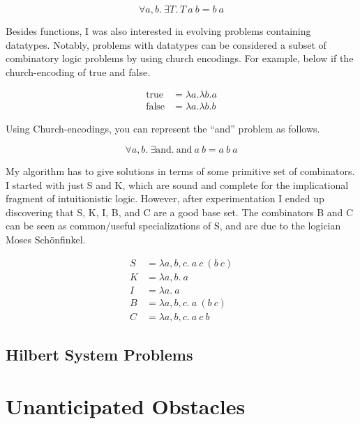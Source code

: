 \documentclass{article}
\begin{document}
$$
\forall a,b . ~ \exists T . ~ T ~ a ~ b = b ~ a
$$

Besides functions, I was also interested in evolving problems
containing datatypes. Notably, problems with datatypes can be
considered a subset of combinatory logic problems by using church
encodings. For example, below if the church-encoding of true and
false.

\begin{align*}
\textrm{true} &= \lambda a. \lambda b. a\\
\textrm{false} &= \lambda a. \lambda b. b
\end{align*}

Using Church-encodings, you can represent the ``and'' problem as
follows.

$$
\forall a,b . ~ \exists \textrm{and} . ~ \textrm{and} ~ a ~ b = a ~ b ~ a
$$

My algorithm has to give solutions in terms of some primitive set of
combinators. I started with just S and K, which are sound and complete
for the implicational fragment of intuitionistic logic. However, after
experimentation I ended up discovering that S, K, I, B, and C are a
good base set. The combinators B and C can be seen as common/useful
specializations of S, and are due to the logician Moses Sch{\"o}nfinkel.

\begin{align*}
S &= \lambda a,b,c . ~ a ~ c ~ (b ~ c)\\
K &= \lambda a,b . ~ a\\
I &= \lambda a . ~ a\\
B &= \lambda a,b,c . ~ a ~ (b ~ c)\\
C &= \lambda a,b,c . ~ a ~ c ~ b
\end{align*}



\subsection{Hilbert System Problems}



\section{Unanticipated Obstacles}
\end{document}
